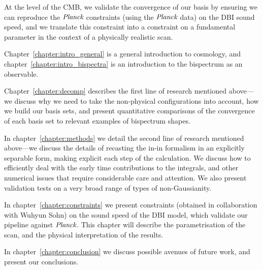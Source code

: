 At the level of the CMB, we validate the convergence of our basis by ensuring we can reproduce the
$\textit{Planck}$ constraints (using the $\textit{Planck}$ data) on the DBI sound speed, and we translate this constraint into a constraint on
a fundamental parameter in the context of a physically realistic scan.



Chapter~\ref{chapter:intro_general} is a general introduction to cosmology, and
chapter~\ref{chapter:intro_bispectra} is an introduction to the bispectrum as an observable.


Chapter~\ref{chapter:decomp} describes the first line of research mentioned above---we
discuss why we need to take the non-physical configurations into account, how we build our
basis sets, and present quantitative comparisons of the convergence of each basis set to
relevant examples of bispectrum shapes.


In chapter~\ref{chapter:methods} we detail the second line of research mentioned above---we
discuss the details of recasting the in-in formalism in an explicitly separable form,
making explicit each step of the calculation.
We discuss how to efficiently deal with the early time contributions to the integrals,
and other numerical issues that require considerable care and attention.
We also present validation tests on a very broad range of types of non-Gaussianity.


In chapter~\ref{chapter:constraints} we present constraints (obtained in collaboration with Wuhyun Sohn)
on the sound speed of the DBI model, which validate our pipeline against $\textit{Planck}$.
This chapter will describe the parametrisation of the scan, and the physical
interpretation of the results.


In chapter~\ref{chapter:conclusion} we discuss possible avenues of future work, and present our conclusions.

